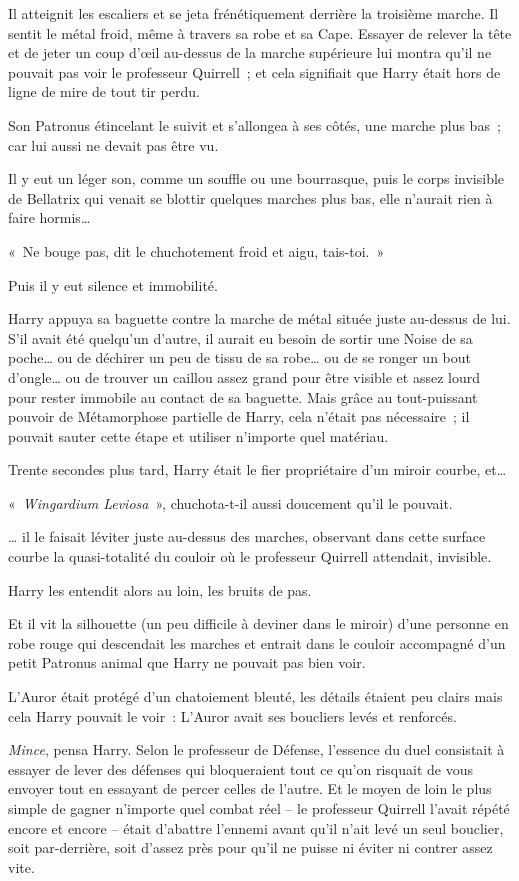 Il atteignit les escaliers et se jeta frénétiquement derrière la troisième marche.
Il sentit le métal froid, même à travers sa robe et sa Cape.
Essayer de relever la tête et de jeter un coup d'œil au-dessus de la marche supérieure lui montra qu'il ne pouvait pas voir le professeur Quirrell~; et cela signifiait que Harry était hors de ligne de mire de tout tir perdu.

Son Patronus étincelant le suivit et s'allongea à ses côtés, une marche plus bas~; car lui aussi ne devait pas être vu.

Il y eut un léger son, comme un souffle ou une bourrasque, puis le corps invisible de Bellatrix qui venait se blottir quelques marches plus bas, elle n'aurait rien à faire hormis…

«~Ne bouge pas, dit le chuchotement froid et aigu, tais-toi.~»

Puis il y eut silence et immobilité.

Harry appuya sa baguette contre la marche de métal située juste au-dessus de lui.
S'il avait été quelqu'un d'autre, il aurait eu besoin de sortir une Noise de sa poche… ou de déchirer un peu de tissu de sa robe… ou de se ronger un bout d'ongle… ou de trouver un caillou assez grand pour être visible et assez lourd pour rester immobile au contact de sa baguette.
Mais grâce au tout-puissant pouvoir de Métamorphose partielle de Harry, cela n'était pas nécessaire~; il pouvait sauter cette étape et utiliser n'importe quel matériau.

Trente secondes plus tard, Harry était le fier propriétaire d'un miroir courbe, et…

«~\emph{Wingardium Leviosa}~», chuchota-t-il aussi doucement qu'il le pouvait.

… il le faisait léviter juste au-dessus des marches, observant dans cette surface courbe la quasi-totalité du couloir où le professeur Quirrell attendait, invisible.

Harry les entendit alors au loin, les bruits de pas.

Et il vit la silhouette (un peu difficile à deviner dans le miroir) d'une personne en robe rouge qui descendait les marches et entrait dans le couloir accompagné d'un petit Patronus animal que Harry ne pouvait pas bien voir.

L'Auror était protégé d'un chatoiement bleuté, les détails étaient peu clairs mais cela Harry pouvait le voir~: L'Auror avait ses boucliers levés et renforcés.

\emph{Mince}, pensa Harry.
Selon le professeur de Défense, l'essence du duel consistait à essayer de lever des défenses qui bloqueraient tout ce qu'on risquait de vous envoyer tout en essayant de percer celles de l'autre.
Et le moyen de loin le plus simple de gagner n'importe quel combat réel -- le professeur Quirrell l'avait répété encore et encore -- était d'abattre l'ennemi avant qu'il n'ait levé un seul bouclier, soit par-derrière, soit d'assez près pour qu'il ne puisse ni éviter ni contrer assez vite.

